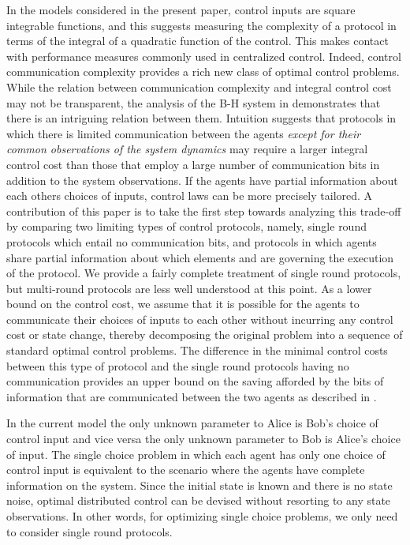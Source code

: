 \documentclass[12pt,onecolumn,draftcls]{IEEEtran}
\begin{document}
In the models considered in the present paper, control inputs are square integrable functions, and this suggests measuring the complexity of a protocol in terms of the integral of a quadratic function of the control.   This makes contact with performance measures commonly used in centralized control.  Indeed, control communication complexity provides a rich new class of optimal control problems. 
While the relation between communication complexity and integral control cost may not be transparent,
the analysis of the B-H system in \cite{WB} demonstrates that there is an intriguing relation between them.   
Intuition suggests that protocols in which there is limited communication between the agents {\em except for their common observations of the system dynamics} may require a larger integral control cost than those that employ
a large number of communication bits in addition to the system observations.  If the agents have partial information about each others choices of inputs, control laws can be more precisely tailored.
A contribution of this paper is to take the first step towards analyzing this trade-off
by comparing two limiting types of control protocols, namely, single round protocols
which entail no communication bits, and protocols in which agents share partial information about which elements  and  are governing the execution of the protocol.  We provide a fairly complete treatment of single round protocols, but multi-round protocols are less well understood at this point.   As a lower bound on the control cost, we assume that it is possible for the agents to communicate their choices  of inputs to each other without incurring any control cost or state change,
thereby decomposing the original problem into a sequence of standard optimal control problems.   The difference in the minimal control
costs between this type of protocol and the single round protocols having no communication provides an upper bound on the saving afforded by the bits of information that are communicated between the two agents as described in \cite{Wong}. 

In the current model the only unknown parameter to Alice is Bob's choice of control input and vice versa
the only unknown parameter to Bob is Alice's choice of input.  The single choice problem in which each agent has only one choice of control input is equivalent to the scenario where the agents have complete information on
the system.   Since the initial state is known and there is no state noise, optimal distributed control can be devised without
resorting to any state observations.  In other words, for optimizing single choice  problems,
we only need to consider single round protocols.  
\end{document}
